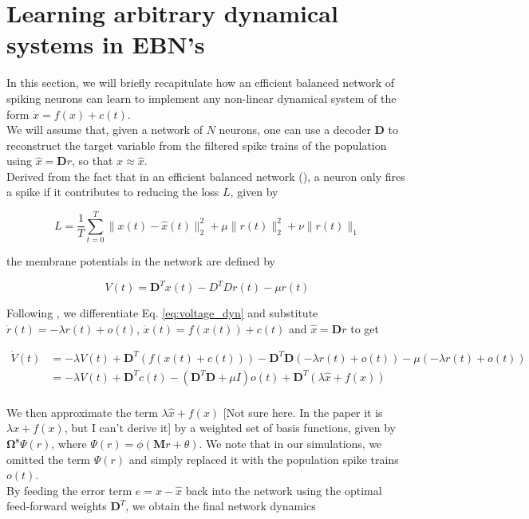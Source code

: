 \documentclass[twoside,11pt,titlepage]{article}
\begin{document}
\section{Learning arbitrary dynamical systems in EBN's} \label{sec:learning_rule}
In this section, we will briefly recapitulate how an efficient balanced network of spiking neurons can learn to implement any non-linear dynamical system of the form $\dot{x}=f(x)+c(t)$. \\
We will assume that, given a network of $N$ neurons, one can use a decoder $\mathbf{D}$ to reconstruct the target variable from the filtered spike trains of the population
using $\hat{x} = \mathbf{D}r$, so that $x \approx \hat{x}$. \\
Derived from the fact that in an efficient balanced network (\cite{Bourdoukan:2012:LOS:2999325.2999390}), a neuron only fires a spike if it contributes to reducing the loss $L$, given by

\begin{equation*}
  L = \frac{1}{T} \sum_{t=0}^T\|x(t)-\hat{x}(t)\|_2^2 + \mu\|r(t)\|_2^2 + \nu\|r(t)\|_1
\end{equation*}

the membrane potentials in the network are defined by

\begin{equation} \label{eq:voltage_dyn}
  V(t) = \mathbf{D}^Tx(t) - D^TDr(t) - \mu r(t)
\end{equation}

Following \cite{alemi2017learning}, we differentiate Eq. \ref{eq:voltage_dyn} and substitute $\dot{r}(t)=-\lambda r(t) + o(t)$, $\dot{x}(t)=f(x(t))+c(t)$ and $\hat{x}=\mathbf{D}r$ to get

\begin{equation*}
  \begin{split}
    \dot{V}(t) &= -\lambda V(t) + \mathbf{D}^T(f(x(t)+c(t))) - \mathbf{D}^T\mathbf{D}(-\lambda r(t)+o(t)) - \mu (-\lambda r(t) + o(t)) \\
    &= - \lambda V(t) + \mathbf{D}^T c(t) - (\mathbf{D}^T\mathbf{D}+\mu I)o(t) + \mathbf{D}^T(\lambda \hat{x} + f(x)) \\
  \end{split}
\end{equation*}

We then approximate the term $\lambda \hat{x} + f(x)$ [Not sure here. In the paper it is $\lambda x + f(x)$, but I can't derive it] by a weighted set of basis functions, given by $\mathbf{\Omega^s} \Psi(r)$, where $\Psi(r)=\phi(\mathbf{M}r+\theta)$. We note that
in our simulations, we omitted the term $\Psi(r)$ and simply replaced it with the population spike trains $o(t)$. \\
By feeding the error term $e = x - \hat{x}$ back into the network using the optimal feed-forward weights $\mathbf{D}^T$, we obtain the final network dynamics
\end{document}
